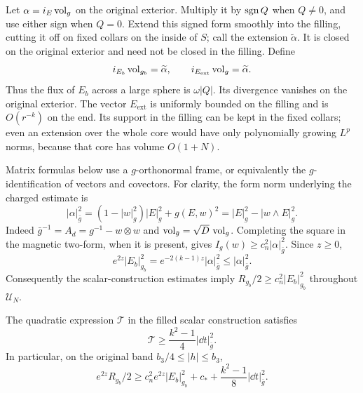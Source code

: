 Let $\alpha=i_E\operatorname{vol}_g$ on the original exterior.  Multiply it by
$\operatorname{sgn} Q$ when $Q\neq0$, and use either sign when $Q=0$.  Extend this signed
form smoothly into the filling, cutting it off on fixed collars on the
inside of $S$; call the extension $\widetilde\alpha$.  It is closed on the
original exterior and need not be closed in the filling.  Define
\begin{equation}
 i_{E_b}\operatorname{vol}_{g_b}=\widetilde\alpha,
 \qquad i_{E_{\mathrm{ext}}}\operatorname{vol}_g=\widetilde\alpha.
 \label{flux:extended-fields}
\end{equation}
Thus the flux of $E_b$ across a large sphere is $\omega|Q|$.  Its divergence
vanishes on the original exterior.  The vector $E_{\mathrm{ext}}$ is
uniformly bounded on the filling and is $O(r^{-k})$ on the end.  Its support
in the filling can be kept in the fixed collars; even an extension over the
whole core would have only polynomially growing $L^p$ norms, because that
core has volume $O(1+N)$.

Matrix formulas below use a $g$-orthonormal frame, or equivalently the
$g$-identification of vectors and covectors.  For clarity, the form norm
underlying the charged estimate is
\begin{equation}
 |\alpha|_{\bar g}^2
   =(1-|w|_g^2)|E|_g^2+g(E,w)^2
   =|E|_g^2-|w\wedge E|_g^2.
 \label{flux:graph-form-norm}
\end{equation}
Indeed $\bar g^{-1}=A_d=g^{-1}-w\otimes w$ and
$\operatorname{vol}_{\bar g}=\sqrt D\,\operatorname{vol}_g$.  Completing the square in the magnetic
two-form, when it is present, gives
$I_g(w)\geq c_n^2|\alpha|_{\bar g}^2$.  Since $z\geq0$,
\begin{equation}
 e^{2z}|E_b|_{g_b}^2
 =e^{-2(k-1)z}|\alpha|_{\bar g}^2
 \leq |\alpha|_{\bar g}^2.
 \label{flux:conformal-field-cost}
\end{equation}
Consequently the scalar-construction estimates imply
$R_{g_b}/2\geq c_n^2|E_b|_{g_b}^2$ throughout $\mathcal U_N$.

\begin{lemma}
\label{flux:retained-gradient}
The quadratic expression $\mathcal T$ in the filled scalar construction
satisfies
\begin{equation}
 \mathcal T\geq\frac{k^2-1}{4}|\dd t|_{\bar g}^2.
 \label{flux:T-gradient}
\end{equation}
In particular, on the original band $b_3/4\leq|h|\leq b_3$,
\begin{equation}
 e^{2z}R_{g_b}/2\geq
 c_n^2 e^{2z}|E_b|_{g_b}^2+c_*+
 \frac{k^2-1}{8}|\dd t|_{\bar g}^2.
 \label{flux:background-band-curvature}
\end{equation}
\end{lemma}

